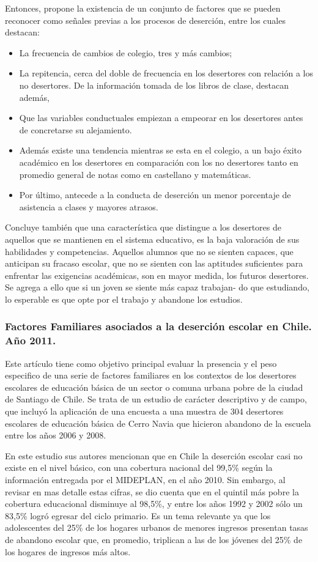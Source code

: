 Entonces, propone la existencia de un conjunto de factores que se pueden reconocer como señales previas a los procesos de deserción, entre los cuales destacan: 
\begin{itemize}
\item La frecuencia de cambios de colegio, tres y más cambios; 
\item La repitencia, cerca del doble de frecuencia en los desertores con relación a los no desertores. De la información tomada de los libros de clase, destacan además, 
\item Que las variables conductuales empiezan a empeorar en los desertores antes de concretarse su alejamiento. 
\item Además existe una tendencia mientras se esta en el colegio, a un bajo éxito académico en los desertores en comparación con los no desertores tanto en promedio general de notas como en castellano y matemáticas. 
\item Por último, antecede a la conducta de deserción un menor porcentaje de asistencia a clases y mayores atrasos. 
\end{itemize}

Concluye también que una característica que distingue a los desertores de aquellos que se mantienen en el sistema educativo, es la baja valoración de sus habilidades y competencias. Aquellos alumnos que no se sienten capaces, que anticipan su fracaso escolar, que no se sienten con las aptitudes suficientes para enfrentar las exigencias académicas, son en mayor medida, los futuros desertores. Se agrega a ello que si un joven se siente más capaz trabajan- do que estudiando, lo esperable es que opte por el trabajo y abandone los estudios.

\subsubsection{Factores Familiares asociados a la deserción escolar en Chile. Año 2011.}
Este artículo tiene como objetivo principal evaluar la presencia y el peso especifico de una serie de factores familiares en los contextos de los desertores escolares de educación básica de un sector o comuna urbana pobre de la ciudad de Santiago de Chile. Se trata de un estudio de carácter descriptivo y de campo, que incluyó la aplicación de una encuesta a una muestra de 304 desertores escolares de educación básica de Cerro Navia que hicieron abandono de la escuela entre los años 2006 y 2008. 

En este estudio sus autores mencionan que en Chile la deserción escolar casi no existe en el nivel básico, con una cobertura nacional del 99,5\% según la información entregada por el MIDEPLAN, en el año 2010.  Sin embargo, al revisar en mas detalle estas cifras, se dio cuenta que en el quintil más pobre la cobertura educacional disminuye al 98,5\%, y entre los años 1992 y 2002 sólo un 83,5\% logró egresar del ciclo primario. Es un tema relevante ya que los adolescentes del 25\% de los hogares urbanos de menores ingresos presentan tasas de abandono escolar que, en promedio, triplican a las de los jóvenes del 25\% de los hogares de ingresos más altos.

